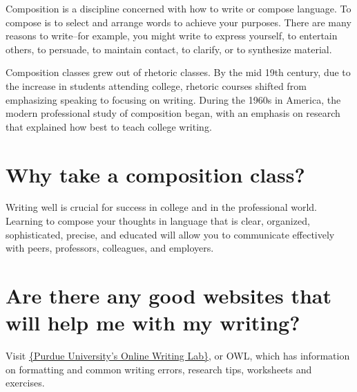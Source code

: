 Composition is a discipline concerned with how to write or compose language. To 
compose is to select and arrange words to achieve your purposes. There are many 
reasons to write--for example, you might write to express yourself, to entertain others, 
to persuade, to maintain contact, to clarify, or to synthesize material.

Composition classes grew out of rhetoric classes. By the mid 19th century, due to the 
increase in students attending college, rhetoric courses shifted from emphasizing 
speaking to focusing on writing. During the 1960s in America, the modern professional 
study of composition began, with an emphasis on research that explained how best to 
teach college writing.
 
\section{Why take a composition class?}

Writing well is crucial for success in college and in the professional world. Learning to 
compose your thoughts in language that is clear, organized, sophisticated, precise, and 
educated will allow you to communicate effectively with peers, professors, colleagues, 
and employers.


\section{Are there any good websites that will help me with my writing?}
Visit \href{http://owl.english.purdue.edu}{\{Purdue University's Online Writing Lab\}}, or 
OWL, which has information on formatting and common writing errors, research tips, 
worksheets and exercises.


